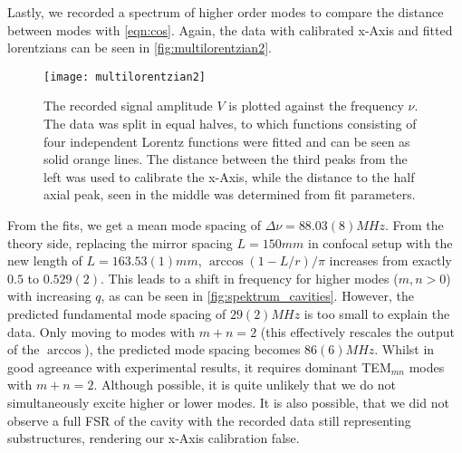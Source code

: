 Lastly, we recorded a spectrum of higher order modes to compare the distance between modes with \autoref{eqn:cos}. Again, the data with calibrated x-Axis and fitted lorentzians can be seen in \autoref{fig:multilorentzian2}. 

\begin{figure}[H]
	\centering
	\texttt{[image: multilorentzian2]}
	\caption{The recorded signal amplitude $V$ is plotted against the frequency $\nu$. The data was split in equal halves, to which functions consisting of four independent Lorentz functions were fitted and can be seen as solid orange lines. The distance between the third peaks from the left was used to calibrate the x-Axis, while the distance to the half axial peak, seen in the middle was determined from fit parameters.}
	\label{fig:multilorentzian2}
\end{figure}

From the fits, we get a mean mode spacing of $\Delta\nu = 88.03(8) \unit{MHz}$. From the theory side, replacing the mirror spacing $L = 150 \unit{mm}$ in confocal setup with the new length of $L = 163.53(1) \unit{mm}$, $\arccos(1 - L/r)/\pi$ increases from exactly $0.5$ to $0.529(2)$. This leads to a shift in frequency for higher modes ($m,n > 0$) with increasing $q$, as can be seen in \autoref{fig:spektrum_cavities}. However, the predicted fundamental mode spacing of $29(2) \unit{MHz}$ is too small to explain the data. Only moving to modes with $m+n = 2$ (this effectively rescales the output of the $\arccos$), the predicted mode spacing becomes $86(6) \unit{MHz}$. Whilst in good agreeance with experimental results, it requires dominant TEM$_{mn}$ modes with $m+n = 2$. Although possible, it is quite unlikely that we do not simultaneously excite higher or lower modes. It is also possible, that we did not observe a full FSR of the cavity with the recorded data still representing substructures, rendering our x-Axis calibration false. 










